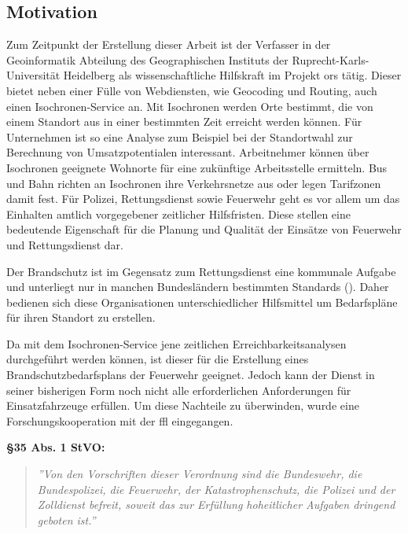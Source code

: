 \documentclass[12pt,a4paper]{article}
\begin{document}
\subsection{Motivation}
Zum Zeitpunkt der Erstellung dieser Arbeit ist der Verfasser in der Geoinformatik Abteilung des Geographischen Instituts der Ruprecht-Karls-Universität Heidelberg als wissenschaftliche Hilfskraft im Projekt \gls{ors} tätig. Dieser bietet neben einer Fülle von Webdiensten, wie Geocoding und Routing, auch einen Isochronen-Service an. Mit Isochronen werden Orte bestimmt, die von einem Standort aus in einer bestimmten Zeit erreicht werden können. Für Unternehmen ist so eine Analyse zum Beispiel bei der Standortwahl zur Berechnung von Umsatzpotentialen interessant. Arbeitnehmer können über Isochronen geeignete Wohnorte für eine zukünftige Arbeitsstelle ermitteln. Bus und Bahn richten an Isochronen ihre Verkehrsnetze aus oder legen Tarifzonen damit fest.
Für Polizei, Rettungsdienst sowie Feuerwehr geht es vor allem um das Einhalten amtlich vorgegebener zeitlicher Hilfsfristen. Diese stellen eine bedeutende Eigenschaft für die Planung und Qualität der Einsätze von Feuerwehr und Rettungsdienst dar.\par
Der Brandschutz ist im Gegensatz zum Rettungsdienst eine kommunale Aufgabe und unterliegt nur in manchen Bundesländern bestimmten Standards (\cite{bedarfsplan}). Daher bedienen sich diese Organisationen unterschiedlicher Hilfsmittel um Bedarfspläne für ihren Standort zu erstellen.
\medskip

Da mit dem Isochronen-Service jene zeitlichen Erreichbarkeitsanalysen durchgeführt werden können, ist dieser für die Erstellung eines Brandschutzbedarfsplans der Feuerwehr geeignet. Jedoch kann der Dienst in seiner bisherigen Form noch nicht alle erforderlichen Anforderungen für Einsatzfahrzeuge erfüllen. Um diese Nachteile zu überwinden, wurde eine Forschungskooperation mit der \gls{ffl} eingegangen.
\vspace{1.2cm}

\textbf{§35 Abs. 1 StVO:}
\begin{quotation}
\label{cit:STVO}
{\itshape\rmfamily ''Von den Vorschriften dieser Verordnung sind die Bundeswehr, die Bundespolizei, die Feuerwehr, der Katastrophenschutz, die Polizei und der Zolldienst befreit, soweit das zur Erfüllung hoheitlicher Aufgaben dringend geboten ist.''}
\end{quotation}

\vspace{1.2cm}
\end{document}
